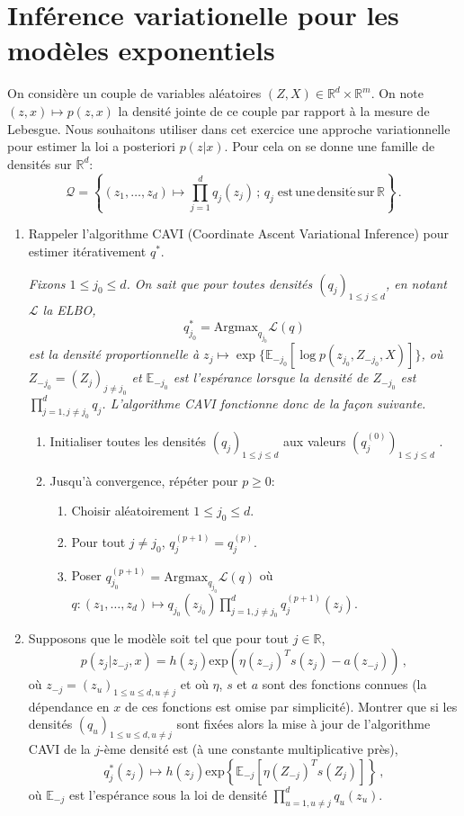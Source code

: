 \documentclass[a4paper,10pt,fleqn]{article}
\newcommand{\eqsp}{\,}
\newcommand{\1}{\ensuremath{\mathbbm{1}}}
\begin{document}
\section{Inf\'erence variationelle pour les mod\`eles exponentiels}
On consid\`ere un couple de variables al\'eatoires $(Z,X)\in\mathbb{R}^d\times \mathbb{R}^m$. On note $(z,x) \mapsto p(z,x)$ la densit\'e jointe de ce couple par rapport \`a la mesure de Lebesgue. Nous souhaitons utiliser dans cet exercice une approche variationnelle pour estimer la loi a posteriori $p(z|x)$. Pour cela on se donne une famille de densit\'es sur $\mathbb{R}^d$:
$$
\mathcal{Q} = \left\{(z_1,\ldots,z_d)\mapsto \prod_{j=1}^dq_j(z_j)\eqsp;\eqsp q_j\; \mathrm{est\,une\,densit\acute e\,sur\,\mathbb{R}}\right\}\eqsp.
$$
\begin{enumerate}
\item Rappeler l'algorithme CAVI (Coordinate Ascent Variational Inference) pour estimer it\'erativement $q^*$.

\vspace{.2cm}

{\em
Fixons $1\leq j_0 \leq d$. On sait que pour toutes densit\'es $(q_j)_{1\leq j \leq d}$, en notant $\mathcal{L}$ la ELBO,
$$
q_{j_0}^* = \mathrm{Argmax}_{q_{j_0}} \mathcal{L}(q) 
$$
est la densit\'e proportionnelle \`a $z_j \mapsto \exp\{\mathbb{E}_{-j_0}[\log p (z_{j_0},Z_{-j_0},X)]\}$, o\`u $Z_{-j_0} = (Z_j)_{j\neq j_0}$ et $\mathbb{E}_{-j_0}$ est l'esp\'erance lorsque la densit\'e de $Z_{-j_0}$ est $\prod_{j=1,j\neq j_0}^dq_j$. L'algorithme CAVI fonctionne donc de la fa\c con suivante.
\begin{enumerate}
\item Initialiser toutes les densit\'es $(q_j)_{1\leq j \leq d}$ aux valeurs $(q^{(0)}_j)_{1\leq j \leq d}$ .
\item Jusqu'\`a convergence, r\'ep\'eter pour $p\geq 0$:
\begin{enumerate}
\item Choisir al\'eatoirement $1\leq j_0 \leq d$.
\item Pour tout $j\neq j_0$, $q^{(p+1)}_j = q^{(p)}_j$.
\item Poser $q^{(p+1)}_{j_0} = \mathrm{Argmax}_{q_{j_0}} \mathcal{L}(q)$ o\`u $q:(z_1,\ldots,z_d)\mapsto q_{j_0}(z_{j_0})\prod_{j=1,j\neq j_0}^{d}q^{(p+1)}_j(z_j)$. 
\end{enumerate}
\end{enumerate}
}
\item Supposons que le mod\`ele soit tel que pour tout $j\in\mathbb{R}$, 
$$
p(z_j|z_{-j},x) = h(z_j)\mathrm{exp}(\eta(z_{-j})^Ts(z_j) - a(z_{-j}))\eqsp,
$$ 
o\`u $z_{-j} = (z_u)_{1\leqslant u\leqslant d, u \neq j}$ et o\`u $\eta$, $s$ et $a$ sont des fonctions connues (la d\'ependance en $x$ de ces fonctions est omise par simplicit\'e). Montrer que si les densit\'es $(q_u)_{1\leqslant u\leqslant d, u \neq j}$ sont fix\'ees alors la mise \`a jour de l'algorithme CAVI de la $j$-\`eme densit\'e est  (\`a une constante multiplicative pr\`es),
$$
q^*_j(z_j) \mapsto h(z_j) \mathrm{exp}\left\{\mathbb{E}_{-j}[\eta(Z_{-j})^Ts(Z_j)]\right\}\eqsp,
$$
o\`u $\mathbb{E}_{-j}$ est l'esp\'erance sous la loi de densit\'e $\prod_{u=1, u\neq j}^d q_u(z_u)$.


\end{enumerate}
\end{document}
